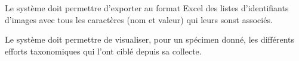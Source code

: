 \startsection[title={Exports}]

\exig{}
Le système doit permettre d'exporter au format Excel des listes d'identifiants d'images avec tous les caractères (nom et valeur) qui leurs sonst associés.

\startsection[title={Taxonomie}]

\exig{}
Le système doit permettre de visualiser, pour un spécimen donné, les différents efforts taxonomiques qui l'ont ciblé depuis sa collecte.
